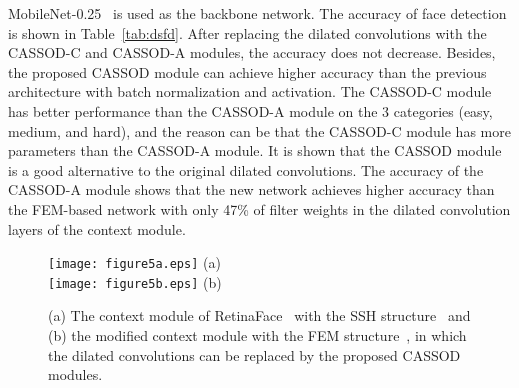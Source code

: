 \documentclass[10pt,twocolumn,letterpaper]{article}
\begin{document}
MobileNet-0.25~\cite{Howard17} is used as the backbone network. The accuracy of face detection is shown in Table~\ref{tab:dsfd}. After replacing the dilated convolutions with the CASSOD-C and CASSOD-A modules, the accuracy does not decrease. Besides, the proposed CASSOD module can achieve higher accuracy than the previous architecture with batch normalization and activation. The CASSOD-C module has better performance than the CASSOD-A module on the 3 categories (easy, medium, and hard), and the reason can be that the CASSOD-C module has more parameters than the CASSOD-A module. It is shown that the CASSOD module is a good alternative to the original dilated convolutions. The accuracy of the CASSOD-A module shows that the new network achieves higher accuracy than the FEM-based network with only 47\% of filter weights in the dilated convolution layers of the context module.

\begin{figure*}[t]
\begin{center}
   \texttt{[image: figure5a.eps]} (a)\\
   \texttt{[image: figure5b.eps]} (b)\\
\end{center}
   \caption{(a) The context module of RetinaFace~\cite{Deng19} with the SSH structure~\cite{Najibi17} and (b) the modified context module with the FEM structure~\cite{Li18_1}, in which the dilated convolutions can be replaced by the proposed CASSOD modules.}
\label{fig:dsfd}
\end{figure*}
\end{document}
